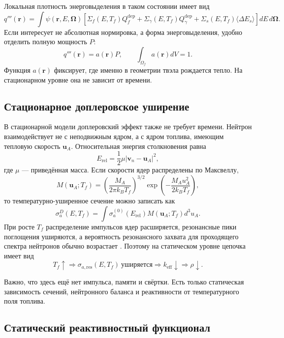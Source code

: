 \documentclass[12pt]{article}
\begin{document}
Локальная плотность энерговыделения в таком состоянии имеет вид
\[
q'''(\mathbf r)
=
\int
\psi(\mathbf r,E,\boldsymbol{\Omega})
\left[
\Sigma_f(E,T_f)Q_f^{\mathrm{dep}}
+
\Sigma_\gamma(E,T_f)Q_\gamma^{\mathrm{dep}}
+
\Sigma_s(E,T_f)\langle\Delta E_s\rangle
\right]
dE\,d\boldsymbol{\Omega}.
\]
Если интересует не абсолютная нормировка, а форма энерговыделения, удобно отделить полную мощность \(P\):
\[
q'''(\mathbf r)=a(\mathbf r)P,
\qquad
\int_{\Omega_f}a(\mathbf r)dV=1.
\]
Функция \(a(\mathbf r)\) фиксирует, где именно в геометрии твэла рождается тепло. На стационарном уровне она не зависит от времени.

\subsection{Стационарное доплеровское уширение}

В стационарной модели доплеровский эффект также не требует времени. Нейтрон взаимодействует не с неподвижным ядром, а с ядром топлива, имеющим тепловую скорость \(\mathbf u_A\). Относительная энергия столкновения равна
\[
E_{\mathrm{rel}}
=
\frac{1}{2}\mu|\mathbf v_n-\mathbf u_A|^2,
\]
где \(\mu\) --- приведённая масса. Если скорости ядер распределены по Максвеллу,
\[
M(\mathbf u_A;T_f)
=
\left(\frac{M_A}{2\pi k_BT_f}\right)^{3/2}
\exp\left(-\frac{M_Au_A^2}{2k_BT_f}\right),
\]
то температурно-уширенное сечение можно записать как
\[
\sigma_a^D(E,T_f)
=
\int
\sigma_a^{(0)}(E_{\mathrm{rel}})
M(\mathbf u_A;T_f)d^3u_A.
\]
При росте \(T_f\) распределение импульсов ядер расширяется, резонансные пики поглощения уширяются, а вероятность резонансного захвата для проходящего спектра нейтронов обычно возрастает \cite{NRCFeedback2012,DOEGeneralTechnicalBase2013}. Поэтому на статическом уровне цепочка имеет вид
\[
T_f\uparrow
\Rightarrow
\sigma_{a,\mathrm{res}}(E,T_f)\ \text{уширяется}
\Rightarrow
k_{\mathrm{eff}}\downarrow
\Rightarrow
\rho\downarrow.
\]

Важно, что здесь ещё нет импульса, памяти и свёртки. Есть только статическая зависимость сечений, нейтронного баланса и реактивности от температурного поля топлива.

\subsection{Статический реактивностный функционал}
\end{document}
